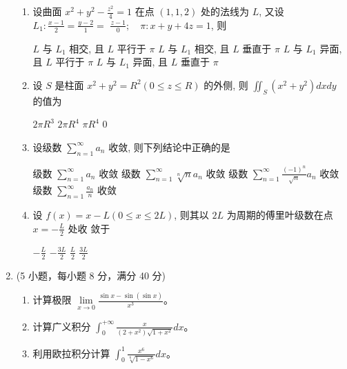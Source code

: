 \begin{enumerate}
\begin{enumerate}
\item 
设曲面 $x^{2}+y^{2}-\frac{z^{2}}{4}=1$ 在点 $(1,1,2)$ 处的法线为 $L$, 又设 $L_{1}: \frac{x-1}{2}=\frac{y-2}{1}=$ $\frac{z-1}{0} ; \quad \pi: x+y+4 z=1$, 则  


\fourchoices
{$L$ 与 $L_{1}$ 相交, 且 $L$ 平行于 $\pi$}
{$L$ 与 $L_{1}$ 相交, 且 $L$ 垂直于 $\pi$}
{$L$ 与 $L_{1}$ 异面, 且 $L$ 平行于 $\pi$}
{$L$ 与 $L_{1}$ 异面, 且 $L$ 垂直于 $\pi$}

\item 
设 $S$ 是柱面 $x^{2}+y^{2}=R^{2}(0 \leqslant z \leqslant R)$ 的外侧, 则 $\iint_{S}\left(x^{2}+y^{2}\right) d x d y$ 的值为  


\fourchoices
{$2 \pi R^{3}$}
{$2 \pi R^{4}$}
{$\pi R^{4}$}
{$ 0 $}

\item 
设级数 $\sum\limits_{n=1}^{\infty} a_{n}$ 收敛, 则下列结论中正确的是  


\fourchoices
{级数 $\sum\limits_{n=1}^{\infty} a_{n}$ 收敛}
{级数 $\sum\limits_{n=1}^{\infty} \sqrt[n]{n} a_{n}$ 收敛}
{级数 $\sum\limits_{n=1}^{\infty} \frac{(-1)^{n}}{\sqrt{n}} a_{n}$ 收敛}
{级数 $\sum\limits_{n=1}^{\infty} \frac{a_{n}}{n}$ 收敛}

\item 
设 $f(x)=x-L(0 \leqslant x \leqslant 2 L)$, 则其以 $2 L$ 为周期的傅里叶级数在点 $x=-\frac{L}{2}$ 处收 敛于  


\fourchoices
{$-\frac{L}{2}$}
{$-\frac{3 L}{2}$}
{$\frac{L}{2}$}
{$\frac{3 L}{2}$}


	
	
\end{enumerate}

\newpage
\item 
(5 小题，每小题 8 分，满分 40 分)
\begin{enumerate}
	\item
计算极限 $\lim\limits _{x \rightarrow 0} \frac{\sin x-\sin (\sin x)}{x^{3}}$。
	
	
	\item
	计算广义积分 $\int_{0}^{+\infty} \frac{x}{\left(2+x^{2}\right) \sqrt{1+x^{2}}} d x$。
	


\item
 利用欧拉积分计算 $\int_{0}^{1} \frac{x^{6}}{\sqrt[6]{1-x^{6}}} d x$。



\end{enumerate}
\end{enumerate}
